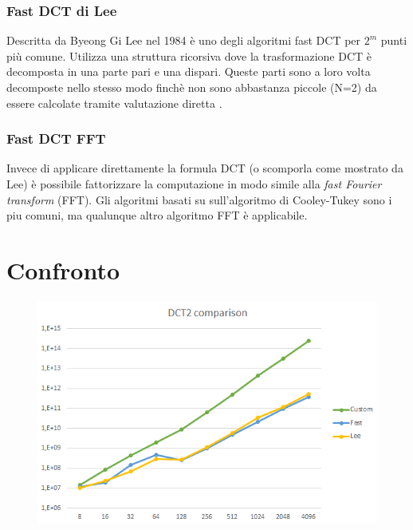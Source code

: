 \documentclass[a4paper,12pt]{report}
\begin{document}
\subsubsection*{Fast DCT di Lee}
Descritta da Byeong Gi Lee \cite{Lee} nel 1984 è uno degli algoritmi fast DCT per \(2^m\) punti più comune. Utilizza una struttura ricorsiva dove la trasformazione DCT è decomposta in una parte pari e una dispari. Queste parti sono a loro volta decomposte nello stesso modo finchè non sono abbastanza piccole (N=2) da essere calcolate tramite valutazione diretta \cite{LAGERSTRM2001DesignAI}.

\subsubsection*{Fast DCT FFT}
Invece di applicare direttamente la formula DCT (o scomporla come mostrato da Lee) è possibile fattorizzare la computazione in modo simile alla \textit{fast Fourier transform} (FFT). Gli algoritmi basati su sull'algoritmo di Cooley-Tukey \cite{10.2307/2003354} sono i piu comuni, ma qualunque altro algoritmo FFT è applicabile. 

\section{Confronto}

\begin{figure}[H]
\centering
\includegraphics[width=0.77\linewidth]{../img/comparison.png}
\label{fig:2}
\end{figure}
\end{document}
